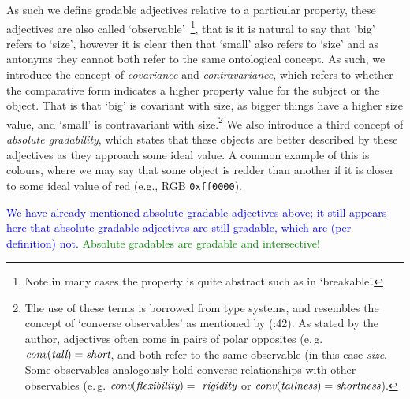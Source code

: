 \documentclass[11pt]{article}
\begin{document}
As such we define gradable adjectives relative to a particular 
property, these adjectives are also called `observable'~\cite{Bennett06kr}\footnote{Note in many cases the property is quite abstract such as in 
`breakable'.}, that is it is natural to say that `big' refers to 
`size', however it is clear then that `small' also refers to `size' and as antonyms 
they cannot both refer to the same ontological concept. As such, we introduce 
the concept of \emph{covariance} and \emph{contravariance}, which refers to 
whether the comparative form indicates a higher property value for the subject 
or the object. That is that `big' is covariant with size, as bigger things have 
a higher size value, and `small' is contravariant with size.\footnote{
    The use of these terms is borrowed from type systems, and resembles the concept of `converse observables' as mentioned by (\cite{Bennett06kr}:42). As stated by the author, adjectives often come in pairs of polar opposites (e.\,g. $\text{\em conv}(\text{\em tall})=\text{\em short}$, and both refer to the same observable (in this case \textit{size}. Some observables analogously hold converse relationships with other observables (e.\,g. $\text{\em conv}(\text{\em flexibility})=\text{\em rigidity}$ or $\text{\em conv}(\text{\em tallness})=\text{\em shortness}$).} 
    We also introduce 
a third concept of \emph{absolute gradability}, which states that these objects 
are better described by these adjectives as they approach some ideal value. 
A common example of this is colours, where we may say that some object is 
redder than another if it is closer to some ideal value of red 
(e.g., RGB {\tt 0xff0000}).

\textcolor{blue}{We have already mentioned absolute gradable adjectives above; it still appears here that absolute gradable adjectives are still gradable, which are (per definition) not.}
\textcolor{green}{Absolute gradables are gradable and intersective!}
\end{document}
